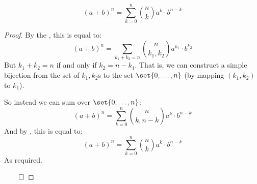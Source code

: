\begin{thrm*}

	\[ (a+b)^n = \sum_{k=0}^n\binom{n}{k} a^k\cdot b^{n-k} \]

\end{thrm*}

\begin{proof}

	By the , this is equal to:
	\[ (a+b)^n = \sum_{k_1+k_2=n}\binom{n}{k_1,k_2} a^{k_1}\cdot b^{k_2} \]
	But $k_1+k_2=n$ if and only if $k_2=n-k_1$. That is, we can construct a simple bijection from the set of $k_1,k_2$s to
	the set $\set{0,\dots,n}$ (by mapping $(k_1,k_2)$ to $k_1$).
	
	So instead we can sum over $\set{0,\dots,n}$:
	\[ (a+b)^n = \sum_{k=0}^n\binom{n}{k,n-k} a^k\cdot b^{n-k} \]
	And by , this is equal to:
	\[ (a+b)^n = \sum_{k=0}^n\binom{n}{k} a^k\cdot b^{n-k} \]
	As required.

\hfill$\qed$

\end{proof}


